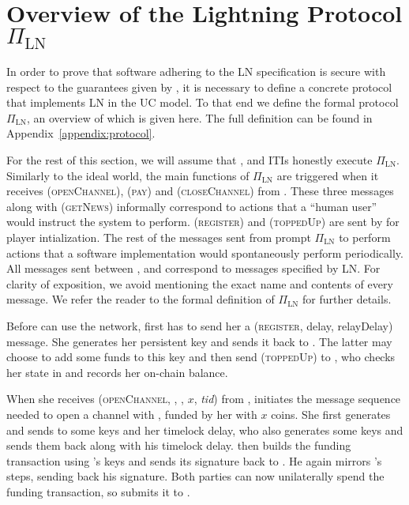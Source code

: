 \section{Overview of the Lightning Protocol $\Pi_{\mathrm{LN}}$}
\label{sec:ov-lightning}

  In order to prove that software adhering to the LN specification is secure
  with respect to the guarantees given by \fpaynet, it is necessary to define a
  concrete protocol that implements LN in the UC model. To that end we define
  the formal protocol $\Pi_{\mathrm{LN}}$, an overview of which is given here.
  The full definition can be found in Appendix~\ref{appendix:protocol}.

  For the rest of this section, we will assume that \alice, \bob{} and
  \charlie{} ITIs honestly execute $\Pi_{\mathrm{LN}}$. Similarly to the ideal
  world, the main functions of $\Pi_{\mathrm{LN}}$ are triggered when it
  receives (\textsc{openChannel}), (\textsc{pay}) and (\textsc{closeChannel})
  from \environment{}. These three messages along with (\textsc{getNews})
  informally correspond to actions that a ``human user'' would instruct the
  system to perform. (\textsc{register}) and (\textsc{toppedUp}) are sent by
  \environment{} for player intialization. The rest of the messages sent from
  \environment{} prompt $\Pi_{\mathrm{LN}}$ to perform actions that a software
  implementation would spontaneously perform periodically. All messages sent
  between \alice, \bob{} and \charlie{} correspond to messages specified by LN.
  For clarity of exposition, we avoid mentioning the exact name and contents of
  every message. We refer the reader to the formal definition of
  $\Pi_{\mathrm{LN}}$ for further details.

    Before \alice{} can use the network, \environment{} first has to send her a
    (\textsc{register}, delay, relayDelay) message. She generates her
    persistent key and sends it back to \environment{}. The latter may choose to
    add some funds to this key and then send (\textsc{toppedUp}) to \alice, who
    checks her state in \ledger{} and records her on-chain balance.

    When she receives (\textsc{openChannel}, \alice, \bob, $x$, \textit{tid})
    from \environment, \alice{} initiates the message sequence needed to open a
    channel with \bob, funded by her with $x$ coins. She first generates and
    sends to \bob{} some keys and her timelock delay, who also generates some
    keys and sends them back along with his timelock delay. \alice{} then builds
    the funding transaction using \bob's keys and sends its signature back to
    \bob. He again mirrors \alice's steps, sending back his signature. Both
    parties can now unilaterally spend the funding transaction, so \alice{}
    submits it to \ledger.

